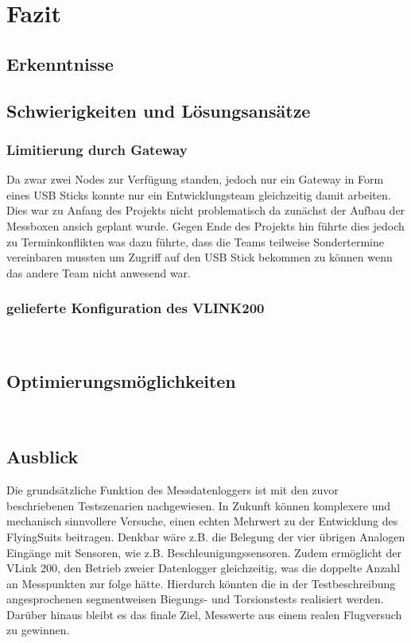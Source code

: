 \chapter{Fazit}
\label{cha:fazit}
\todo{}
\section{Erkenntnisse}

\section{Schwierigkeiten und L\"osungsans\"atze}
\label{sec:probleme}
\subsection{Limitierung durch Gateway}
Da zwar zwei Nodes zur Verfügung standen, jedoch nur ein Gateway in Form eines USB Sticks konnte nur ein Entwicklungsteam gleichzeitig damit arbeiten.
Dies war zu Anfang des Projekts nicht problematisch da zunächst der Aufbau der Messboxen ansich geplant wurde.
Gegen Ende des Projekts hin führte dies jedoch zu Terminkonflikten was dazu führte,
dass die Teams teilweise Sondertermine vereinbaren mussten um Zugriff auf den USB Stick bekommen zu können wenn das andere Team nicht anwesend war.

\subsection{gelieferte Konfiguration des VLINK200}\
\section{Optimierungsm\"oglichkeiten}\
\section{Ausblick}
Die grundsätzliche Funktion des Messdatenloggers ist mit den zuvor beschriebenen Testszenarien nachgewiesen.
In Zukunft können komplexere und mechanisch sinnvollere Versuche, einen echten Mehrwert zu der Entwicklung des FlyingSuits beitragen.
Denkbar wäre z.B. die Belegung der vier übrigen Analogen Eingänge mit Sensoren, wie z.B. Beschleunigungssensoren.
Zudem ermöglicht der VLink 200, den Betrieb zweier Datenlogger gleichzeitig, was die doppelte Anzahl an Messpunkten zur folge hätte.
Hierdurch könnten die in der Testbeschreibung angesprochenen segmentweisen Biegungs- und Torsionstests realisiert werden.
Darüber hinaus bleibt es das finale Ziel, Messwerte aus einem realen Flugversuch zu gewinnen.